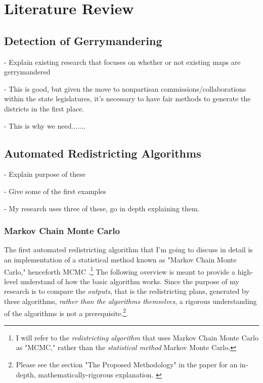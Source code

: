 \section{Literature Review}

\subsection{Detection of Gerrymandering}

- Explain existing research that focuses on whether or not existing maps are gerrymandered

- This is good, but given the move to nonpartisan commissions/collaborations within the state legislatures, it's necessary to have fair methods to generate the districts in the first place. 

- This is why we need.......

\subsection{Automated Redistricting Algorithms}

- Explain purpose of these

- Give some of the first examples

- My research uses three of these, go in depth explaining them. 

\subsubsection{Markov Chain Monte Carlo}

The first automated redistricting algorithm that I'm going to discuss in detail is an implementation of a statistical method known as "Markov Chain Monte Carlo," henceforth MCMC \parencite{fifield2020}.\footnote{I will refer to the \emph{redistricting algorithm} that uses Markov Chain Monte Carlo as "MCMC," rather than the \emph{statistical method} Markov Monte Carlo.} The following overview is meant to provide a high-level understand of how the basic algorithm works. Since the purpose of my research is to compare the \emph{outputs}, that is the redistricting plans, generated by these algorithms, \emph{rather than the algorithms themselves}, a rigorous understanding of the algorithms is not a prerequisite.\footnote{Please see the section "The Proposed Methodology" in the paper for an in-depth, mathematically-rigorous explanation. \parencite[2]{fifield2020}}.

